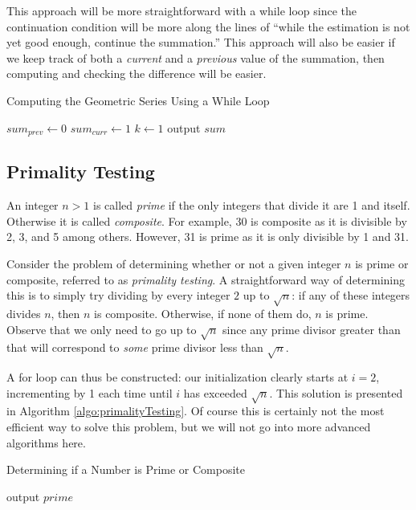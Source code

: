 This approach will be more straightforward with a while loop since the 
continuation condition will be more along the lines of ``while the estimation
is not yet good enough, continue the summation.''  This approach will
also be easier if we keep track of both a \emph{current} and a \emph{previous}
value of the summation, then computing and checking the difference will
be easier.

\begin{algorithm}[h]
\caption{Computing the Geometric Series Using a While Loop}
\label{algo:geometricSeriesWhileLoop}
$sum_{prev} \leftarrow 0$ \;
$sum_{curr} \leftarrow 1$ \;
$k \leftarrow 1$ \;
output $sum$ \;
\end{algorithm}

\subsection{Primality Testing}

An integer $n > 1$ is called \emph{prime} if the only integers that divide it are 1 
and itself.  Otherwise it is called \emph{composite}.  For example, 30 is composite
as it is divisible by 2, 3, and 5 among others.  However, 31 is prime as it is only 
divisible by 1 and 31.

Consider the problem of determining whether or not a given integer $n$ is prime or 
composite, referred to as \emph{primality testing}.  A straightforward way of determining
this is to simply try dividing by every integer $2$ up to $\sqrt{n}$: if any of these integers
divides $n$, then $n$ is composite.  Otherwise, if none of them do, $n$ is prime.  
Observe that we only need to go up to $\sqrt{n}$ since any prime divisor greater
than that will correspond to \emph{some} prime divisor less than $\sqrt{n}$.

A for loop can thus be constructed: our initialization clearly starts at $i = 2$, 
incrementing by 1 each time until $i$ has exceeded $\sqrt{n}$.  This solution
is presented in Algorithm \ref{algo:primalityTesting}.  Of course this is certainly
not the most efficient way to solve this problem, but we will not go into 
more advanced algorithms here.

\begin{algorithm}[h]
\caption{Determining if a Number is Prime or Composite}
\label{algo:primalityTesting}
output $prime$ \;
\end{algorithm}

